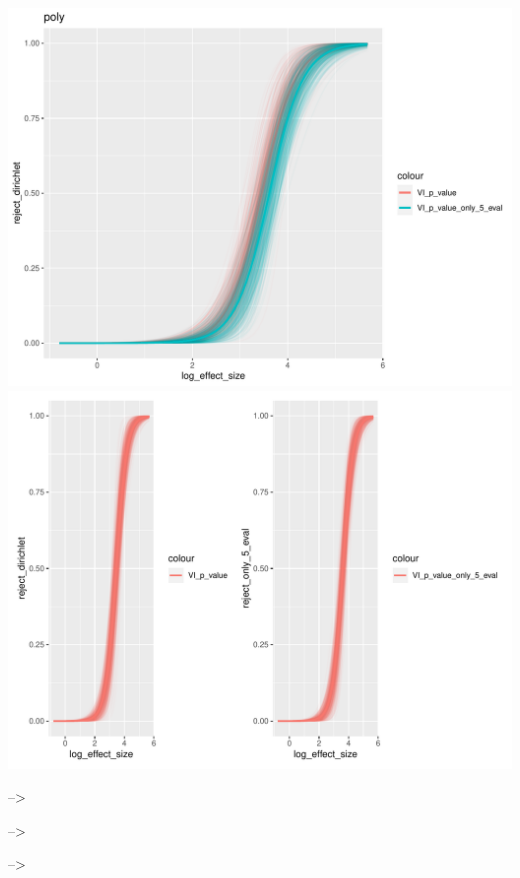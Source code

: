 \documentclass[]{interact}
\theoremstyle{plain}%
\theoremstyle{definition}
\theoremstyle{remark}
\begin{document}
\includegraphics[width=1\linewidth]{paper_comparison_files/figure-latex/unnamed-chunk-14-1}
\includegraphics[width=1\linewidth]{paper_comparison_files/figure-latex/unnamed-chunk-14-2}

--\textgreater{}

--\textgreater{}

--\textgreater{}



\end{document}
